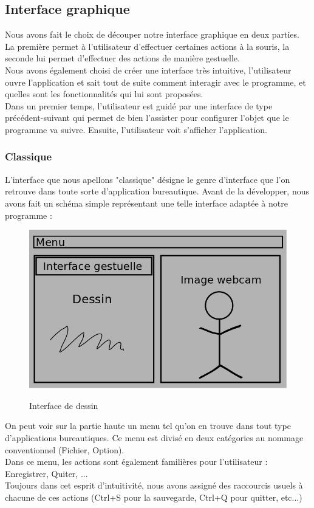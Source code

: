 \documentclass{report}
\begin{document}
		\subsection{Interface graphique}
			Nous avons fait le choix de découper notre interface graphique en deux parties. La première permet à l'utilisateur d'effectuer certaines actions à la souris, la seconde lui permet d'effectuer des actions de manière gestuelle. \\
			Nous avons également choisi de créer une interface très intuitive, l'utilisateur ouvre l'application et sait tout de suite comment interagir avec le programme, et quelles sont les fonctionnalités qui lui sont proposées. \\
			Dans un premier temps, l'utilisateur est guidé par une interface de type précédent-suivant qui permet de bien l'assister pour configurer l'objet que le programme va suivre. Ensuite, l'utilisateur voit s'afficher l'application.
			\subsubsection{Classique}
				L'interface que nous apellons "classique" désigne le genre d'interface que l'on retrouve dans toute sorte d'application bureautique. Avant de la développer, nous avons fait un schéma simple représentant une telle interface adaptée à notre programme : \\
			\begin{figure}[!h]
						\centering
						\includegraphics[scale=0.4]{../images/interface.png}\\
						\caption{Interface de dessin}
						\label{Interface de dessin}
			\end{figure}
			
			On peut voir sur la partie haute un menu tel qu'on en trouve dans tout type d'applications bureautiques. Ce menu est divisé en deux catégories au nommage conventionnel (Fichier, Option). \\
			Dans ce menu, les actions sont également familières pour l'utilisateur : Enregistrer, Quiter, ... \\
			Toujours dans cet esprit d'intuitivité, nous avons assigné des raccourcis usuels à chacune de ces actions (Ctrl+S pour la sauvegarde, Ctrl+Q pour quitter, etc...)
			
\end{document}
